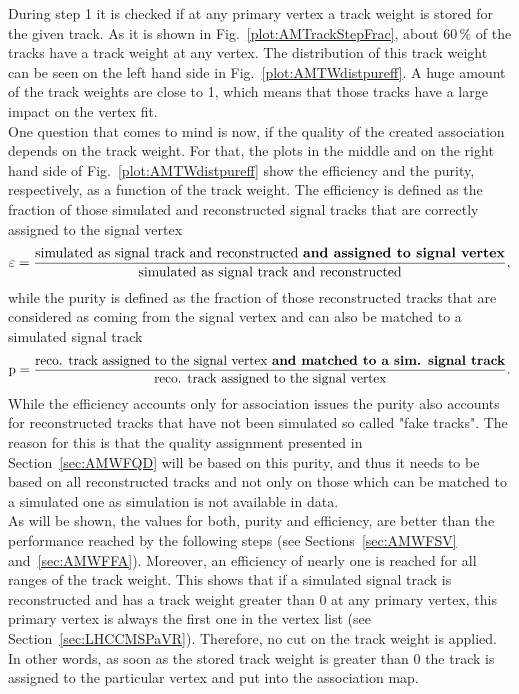 During step 1 it is checked if at any primary vertex a track weight is stored for the given track.  As it is shown in Fig.~\ref{plot:AMTrackStepFrac}, about $60\,\%$ of the tracks have a track weight at any vertex. The distribution of this track weight can be seen on the left hand side in Fig.~\ref{plot:AMTWdistpureff}. A huge amount of the track weights are close to 1, which means that those tracks have a large impact on the vertex fit.\\
One question that comes to mind is now, if the quality of the created association depends on the track weight. For that, the plots in the middle and on the right hand side of Fig.~\ref{plot:AMTWdistpureff} show the efficiency and the purity, respectively, as a function of the track weight. The efficiency is defined as the fraction of those simulated and reconstructed signal tracks that are correctly assigned to the signal vertex
\begin{equation}
    \varepsilon = \frac{\textrm{simulated as signal track and reconstructed \textbf{and assigned to signal vertex}}}{\textrm{simulated as signal track and reconstructed}},
    \label{eq:Efficiency}
\end{equation}
while the purity is defined as the fraction of those reconstructed tracks that are considered as coming from the signal vertex and can also be matched to a simulated signal track
\begin{equation}
    \textrm{p} = \frac{\textrm{reco. track assigned to the signal vertex \textbf{and matched to a sim. signal track}}}{\textrm{reco. track assigned to the signal vertex}}.
    \label{eq:Purity}
\end{equation}
While the efficiency accounts only for association issues the purity also accounts for reconstructed tracks that have not been simulated so called "fake tracks". The reason for this is that the quality assignment presented in Section~\ref{sec:AMWFQD} will be based on this purity, and thus it needs to be based on all reconstructed tracks and not only on those which can be matched to a simulated one as simulation is not available in data. \\
As will be shown, the values for both, purity and efficiency, are better than the performance reached by the following steps (see Sections~\ref{sec:AMWFSV} and~\ref{sec:AMWFFA}). Moreover, an efficiency of nearly one is reached for all ranges of the track weight. This shows that if a simulated signal track is reconstructed and has a track weight greater than 0 at any primary vertex, this primary vertex is always the first one in the vertex list (see Section~\ref{sec:LHCCMSPaVR}). Therefore, no cut on the track weight is applied. In other words, as soon as the stored track weight is greater than 0 the track is assigned to the particular vertex and put into the association map.

